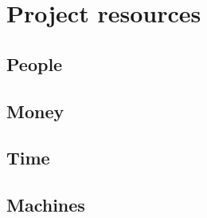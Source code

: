 \documentclass[oneside, DIV=11]{scrreprt}
\begin{document}
\chapter{Project resources}

    \section{People}
    
    \section{Money}
    
    \section{Time}

    \section{Machines}






\label{LastPage}
\end{document}
